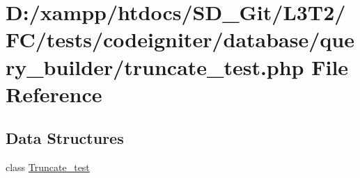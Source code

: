 \hypertarget{tests_2codeigniter_2database_2query__builder_2truncate__test_8php}{}\section{D\+:/xampp/htdocs/\+S\+D\+\_\+\+Git/\+L3\+T2/\+F\+C/tests/codeigniter/database/query\+\_\+builder/truncate\+\_\+test.php File Reference}
\label{tests_2codeigniter_2database_2query__builder_2truncate__test_8php}
\subsection*{Data Structures}
\begin{DoxyCompactItemize}
\item 
class \hyperlink{class_truncate__test}{Truncate\+\_\+test}
\end{DoxyCompactItemize}
